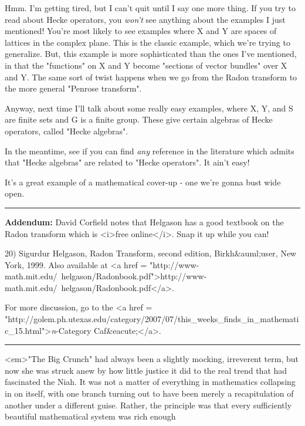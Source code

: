 Hmm.  I'm getting tired, but I can't quit until I say one more
thing.  If you try to read about Hecke operators, you \emph{won't}
see anything about the examples I just mentioned!  You're most
likely to see examples where X and Y are spaces of lattices in
the complex plane.  This is the classic example, which we're
trying to generalize.  But, this example is more sophisticated
than the ones I've mentioned, in that the "functions" on X and
Y become "sections of vector bundles" over X and Y.  The same
sort of twist happens when we go from the Radon transform to the
more general "Penrose transform".

Anyway, next time I'll talk about some really easy examples,
where X, Y, and S are finite sets and G is a finite group.
These give certain algebras of Hecke operators, called "Hecke
algebras".

In the meantime, see if you can find \emph{any} reference in the 
literature which admits that "Hecke algebras" are related
to "Hecke operators".  It ain't easy!  

It's a great example of a mathematical cover-up - one we're gonna
bust wide open.

\par\noindent\rule{\textwidth}{0.4pt}
\textbf{Addendum:} David Corfield notes that Helgason has a good
textbook on the Radon transform which is <i>free online</i>.
Snap it up while you can!

20) Sigurdur Helgason, Radon Transform, second edition, Birkh&auml;user,
New York, 1999.
Also available at <a href = "http://www-math.mit.edu/~helgason/Radonbook.pdf">http://www-math.mit.edu/~helgason/Radonbook.pdf</a>.


For more discussion, go to the 
<a href = "http://golem.ph.utexas.edu/category/2007/07/this_weeks_finds_in_mathematic_15.html">\emph{n}-Category Caf&eacute;</a>.

\par\noindent\rule{\textwidth}{0.4pt}
<em>"The Big Crunch" had always been a slightly mocking,
irreverent term, but now she was struck anew by how little justice it
did to the real trend that had fascinated the Niah.  It was not a matter
of everything in mathematics collapsing in on itself, with one branch 
turning out to have been merely a recapitulation of another under a
different guise.  Rather, the principle was that
every sufficiently beautiful mathematical system was rich enough


